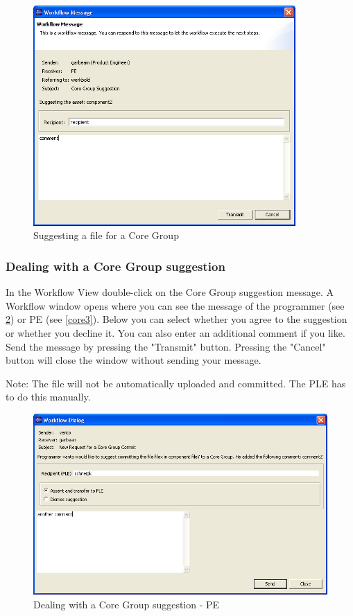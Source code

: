\begin{figure}[h!]
\begin{center}
\includegraphics[width=10cm]{core1.png}
   \caption{Suggesting a file for a Core Group}
\label{core1}
\end{center}
\end{figure}\par

\subsubsection{Dealing with a Core Group suggestion}

In the Workflow View double-click on the Core Group suggestion message. A Workflow
window opens where you can see the message of the programmer (see \ref{core2}) or PE (see \ref{core3}). Below you
can select whether you agree to the suggestion or whether you decline it. You can also
enter an additional comment if you like. Send the message by pressing the "Transmit" 
button. Pressing the "Cancel" button will close the window without sending 
your message.\par
Note: The file will not be automatically uploaded and committed. The PLE has to do
this manually.

\begin{figure}[h!]
\begin{center}
\includegraphics[width=14cm]{core2.png}
   \caption{Dealing with a Core Group suggestion - PE}
\label{core2}
\end{center}
\end{figure}\par

